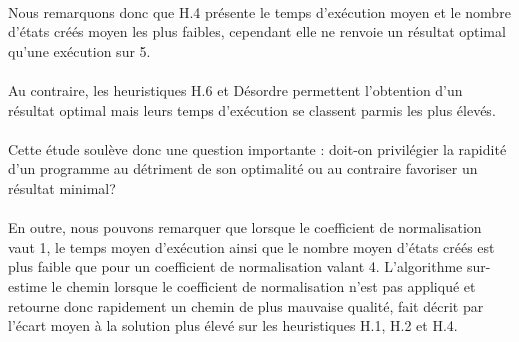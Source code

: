 \documentclass[10pt,a4paper]{report}
\begin{document}

\paragraph{}{Nous remarquons donc que H.4 présente le temps d'exécution moyen et le nombre d'états créés moyen les plus faibles, cependant elle ne renvoie un résultat optimal qu'une exécution sur 5.}

\paragraph{}{Au contraire, les heuristiques H.6 et Désordre permettent l'obtention d'un résultat optimal mais leurs temps d'exécution se classent parmis les plus élevés.}

\paragraph{}{Cette étude soulève donc une question importante : doit-on privilégier la rapidité d'un programme au détriment de son optimalité ou au contraire favoriser un résultat minimal?}

\paragraph{}{En outre, nous pouvons remarquer que lorsque le coefficient de normalisation vaut 1, le temps moyen d'exécution ainsi que le nombre moyen d'états créés est plus faible que pour un coefficient de normalisation valant 4. L'algorithme sur-estime le chemin lorsque le coefficient de normalisation n'est pas appliqué et retourne donc rapidement un chemin de plus mauvaise qualité, fait décrit par l'écart moyen à la solution plus élevé sur les heuristiques H.1, H.2 et H.4.}
\end{document}
